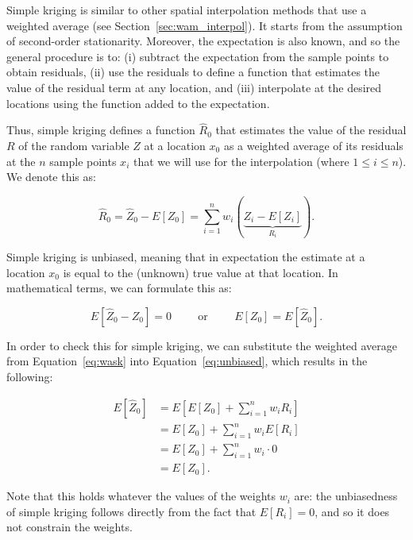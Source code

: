 Simple kriging is similar to other spatial interpolation methods that use a weighted average (see Section~\ref{sec:wam_interpol}).
It starts from the assumption of second-order stationarity.
Moreover, the expectation is also known, and so the general procedure is to: (i) subtract the expectation from the sample points to obtain residuals, (ii) use the residuals to define a function that estimates the value of the residual term at any location, and (iii) interpolate at the desired locations using the function added to the expectation.

Thus, simple kriging defines a function \(\hat{R}_0\) that estimates the value of the residual \(R\) of the random variable \(Z\) at a location \(x_0\) as a weighted average of its residuals at the \(n\) sample points \(x_i\) that we will use for the interpolation (where \(1 \leq i \leq n\)).
We denote this as:

\begin{equation}
\label{eq:wask}
\hat{R}_0 = \hat{Z}_0 - E[Z_0] = \sum_{i=1}^n w_i (\underbrace{Z_i-E[Z_i]}_{R_i}).
\end{equation}

Simple kriging is unbiased, meaning that in expectation the estimate at a location \(x_0\) is equal to the (unknown) true value at that location.
In mathematical terms, we can formulate this as:

\begin{equation}
\label{eq:unbiased}
E\left[ \hat{Z}_0 - Z_0 \right] = 0 \hspace{1cm}\text{or}\hspace{1cm}E\left[Z_0\right] = E\left[ \hat{Z}_0 \right].
\end{equation}

In order to check this for simple kriging, we can substitute the weighted average from Equation~\ref{eq:wask} into Equation~\ref{eq:unbiased}, which results in the following:

\begin{align}
E\left[\hat{Z}_0\right] &= E\left[E[Z_0] + \sum_{i=1}^n w_i R_i\right] \nonumber \\
&= E[Z_0] + \sum_{i=1}^n w_i E[R_i] \nonumber \\
&= E[Z_0] + \sum_{i=1}^n w_i \cdot 0 \nonumber \\
&= E[Z_0]. \nonumber
\end{align}

Note that this holds whatever the values of the weights \(w_i\) are: the unbiasedness of simple kriging follows directly from the fact that \(E[R_i] = 0\), and so it does not constrain the weights.

